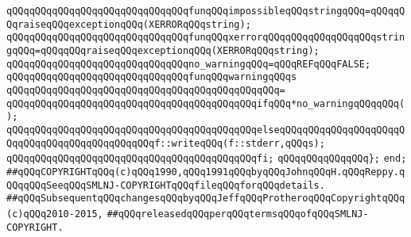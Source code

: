 \verb|qQQqqQQqqQQqqQQqqQQqqQQqqQQqqQQqfunqQQqimpossibleqQQqstringqQQq=qQQqqQQqraiseqQQqexceptionqQQq(XERRORqQQqstring);|\newline
\verb|qQQqqQQqqQQqqQQqqQQqqQQqqQQqqQQqfunqQQqxerrorqQQqqQQqqQQqqQQqqQQqstringqQQq=qQQqqQQqraiseqQQqexceptionqQQq(XERRORqQQqstring);|\newline
\newline
\verb|qQQqqQQqqQQqqQQqqQQqqQQqqQQqqQQqno_warningqQQq=qQQqREFqQQqFALSE;|\newline
\newline
\verb|qQQqqQQqqQQqqQQqqQQqqQQqqQQqqQQqfunqQQqwarningqQQqs|\newline
\verb|qQQqqQQqqQQqqQQqqQQqqQQqqQQqqQQqqQQqqQQqqQQqqQQq=|\newline
\verb|qQQqqQQqqQQqqQQqqQQqqQQqqQQqqQQqqQQqqQQqqQQqifqQQq*no_warningqQQqqQQq();|\newline
\verb|qQQqqQQqqQQqqQQqqQQqqQQqqQQqqQQqqQQqqQQqqQQqelseqQQqqQQqqQQqqQQqqQQqqQQqqQQqqQQqqQQqqQQqqQQqqQQqf::writeqQQq(f::stderr,qQQqs);|\newline
\verb|qQQqqQQqqQQqqQQqqQQqqQQqqQQqqQQqqQQqqQQqqQQqfi;|\newline
\verb|qQQqqQQqqQQqqQQq};|\newline
\newline
\verb|end;|\newline
\newline
\verb|##qQQqCOPYRIGHTqQQq(c)qQQq1990,qQQq1991qQQqbyqQQqJohnqQQqH.qQQqReppy.qQQqqQQqSeeqQQqSMLNJ-COPYRIGHTqQQqfileqQQqforqQQqdetails.|\newline
\verb|##qQQqSubsequentqQQqchangesqQQqbyqQQqJeffqQQqProtheroqQQqCopyrightqQQq(c)qQQq2010-2015,|\newline
\verb|##qQQqreleasedqQQqperqQQqtermsqQQqofqQQqSMLNJ-COPYRIGHT.|\newline

